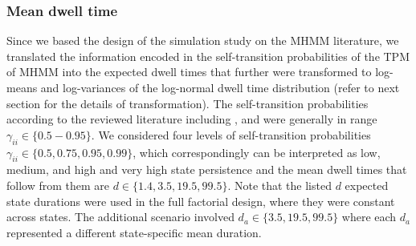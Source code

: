 \subsubsection*{Mean dwell time}
Since we based the design of the simulation study on the MHMM literature, we translated the information encoded in the self-transition probabilities of the TPM of MHMM into the expected dwell times that further were transformed to log-means and log-variances of the log-normal dwell time distribution (refer to next section for the details of transformation). The self-transition probabilities according to the reviewed literature including \cite{altman_mixed_2007,Schliehe_Diecks_Kappeler_Langrock_2012, de_haan_rietdijk_use_2017,Raffa_Dubin_2015,inaba_mixed_2017}, and \cite{Schafer_Wikle_VonBank_Ballard_Weegman_2020} were generally in range $\gamma_{ii}\in\{0.5-0.95\}$. We considered four levels of self-transition probabilities ${\gamma_{ii} \in \{0.5, 0.75, 0.95, 0.99\}}$, which correspondingly can be interpreted as low, medium, and high and very high state persistence and the mean dwell times that follow from them are ${d\in \{1.4,3.5,19.5,99.5\}}$. Note that the listed $d$ expected state durations were used in the full factorial design, where they were constant across states. The additional scenario involved ${d_a\in \{3.5,19.5,99.5\}}$ where each $d_a$ represented a different state-specific mean duration. 



